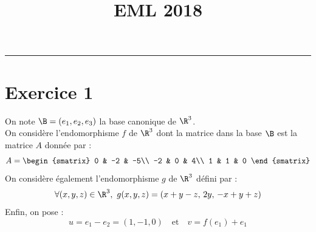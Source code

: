 \documentclass[11pt]{article}%
\title{\bf \vspace{-1.6cm} EML 2018} %
\author{} %
\date{} %
\begin{document}
\maketitle %
\vspace{-1.2cm}\hrule %
\thispagestyle{fancy}

\vspace*{.4cm}


\section*{Exercice 1}

\noindent
On note $\B=(e_1,e_2,e_3)$ la base canonique de $\R^3$.\\
On considère l'endomorphisme $f$ de $\R^3$ dont la matrice dans la base 
$\B$ est la matrice $A$ donnée par :
\[
  A =
  \begin{smatrix}
    0 & -2 & -5\\
    -2 & 0 & 4\\
    1 & 1 & 0
  \end{smatrix}
\]
On considère également l'endomorphisme $g$ de $\R^3$ défini par :
\[
  \forall (x,y,z) \in \R^3, \ g(x,y,z) = (x+y-z, \, 2y, \, -x+y+z)
\]
Enfin, on pose : 
\[
  u=e_1-e_2=(1,-1,0) \quad \text{et} \quad v=f(e_1)+e_1
\]
\end{document}
